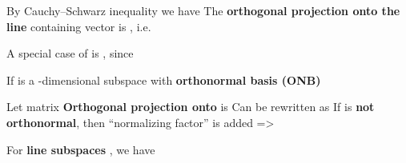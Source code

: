 \begin{itemize}

      \vItem
            By
            Cauchy--Schwarz inequality we have 
      \vItem
            The \textbf{orthogonal projection onto the line} containing vector
             is ,
            i.e. 

            \begin{itemize}
                  \vItem
                        A special case of  is
                        , since
            \end{itemize}
      \vItem
            If  is a -dimensional
            subspace with \textbf{orthonormal basis (ONB)}

            \begin{itemize}

                  \vItem
                        Let
                         matrix
                  \vItem
                        \textbf{Orthogonal projection onto}  is 
                  \vItem
                        Can be rewritten as
                  \vItem
                        If  is
                        \textbf{not orthonormal}, then ``normalizing factor''
                         is added =>

                        \begin{itemize}

                              \vItem
                                    For \textbf{line subspaces} , we
                                    have
                        \end{itemize}
            \end{itemize}
\end{itemize}

